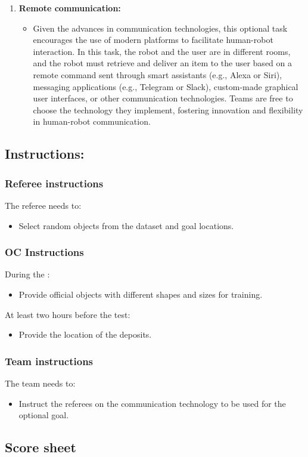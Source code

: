 \begin{enumerate}[nosep]
\begin{itemize}[nosep]
        \end{itemize}
	\item \textbf{Remote communication:} 
        \begin{itemize}[nosep]
            \item Given the advances in communication technologies, this optional task encourages the use of modern platforms to facilitate human-robot interaction. In this task, the robot and the user are in different rooms, and the robot must retrieve and deliver an item to the user based on a remote command sent through smart assistants (e.g., Alexa or Siri), messaging applications (e.g., Telegram or Slack), custom-made graphical user interfaces, or other communication technologies. Teams are free to choose the technology they implement, fostering innovation and flexibility in human-robot communication.
        \end{itemize}
\end{enumerate}

\subsection*{Instructions:}
\subsubsection*{Referee instructions}

The referee needs to:
\begin{itemize}[nosep]
	\item Select random objects from the dataset and goal locations.
\end{itemize}

\subsubsection*{OC Instructions}
During the \SetupDays:
\begin{itemize}[nosep]
	\item Provide official objects with different shapes and sizes for training.
\end{itemize}
At least two hours before the test:
\begin{itemize}[nosep]
	\item Provide the location of the deposits.
\end{itemize}

\subsubsection*{Team instructions}

The team needs to:
\begin{itemize}[nosep]
	\item Instruct the referees on the communication technology to be used for the optional goal.
\end{itemize}

\subsection*{Score sheet}

